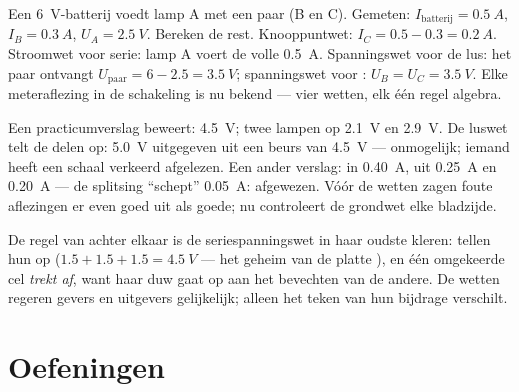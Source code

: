 \begin{example}\label{ex:g8:circuit-laws:worked}
Een \qty{6}{V}-batterij voedt lamp A  met een
 paar (B en C). Gemeten: $I_{\text{batterij}} = \qty{0.5}{A}$,
$I_B = \qty{0.3}{A}$, $U_A = \qty{2.5}{V}$. Bereken de rest.
Knooppuntwet: $I_C = 0.5 - 0.3 = \qty{0.2}{A}$. Stroomwet voor
serie: lamp A voert de volle \qty{0.5}{A}. Spanningswet voor de lus:
het paar ontvangt $U_{\text{paar}} = 6 - 2.5 = \qty{3.5}{V}$;
spanningswet voor : $U_B = U_C = \qty{3.5}{V}$. Elke
meteraflezing in de schakeling is nu bekend --- vier wetten, elk één
regel algebra.
\end{example}

\begin{example}\label{ex:g8:circuit-laws:liedetector}
Een practicumverslag beweert:  \qty{4.5}{V}; twee lampen
 op \qty{2.1}{V} en \qty{2.9}{V}. De luswet telt de delen op:
\qty{5.0}{V} uitgegeven uit een beurs van \qty{4.5}{V} --- onmogelijk;
iemand heeft een schaal verkeerd afgelezen. Een ander verslag:
 in \qty{0.40}{A},  uit \qty{0.25}{A} en
\qty{0.20}{A} --- de splitsing ``schept'' \qty{0.05}{A}: afgewezen.
Vóór de wetten zagen foute aflezingen er even goed uit als goede; nu
controleert de grondwet elke bladzijde.
\end{example}

\begin{remark}\label{rem:g8:circuit-laws:batteries}
De regel van achter elkaar is de seriespanningswet in haar oudste
kleren:   tellen hun  op
($1.5 + 1.5 + 1.5 = \qty{4.5}{V}$ --- het geheim van de platte
), en één omgekeerde cel \emph{trekt af}, want haar duw
gaat op aan het bevechten van de andere. De wetten regeren gevers en
uitgevers gelijkelijk; alleen het teken van hun bijdrage verschilt.
\end{remark}

\section{Oefeningen}

